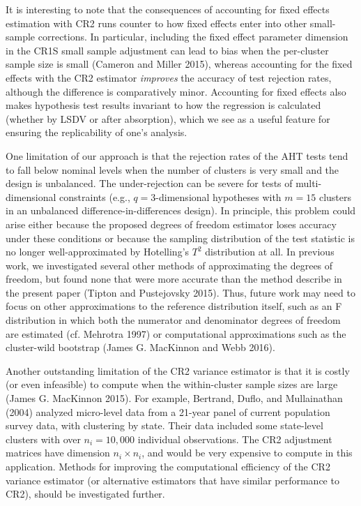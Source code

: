 \documentclass[12pt]{article}
\begin{document}
It is interesting to note that the consequences of accounting for fixed
effects estimation with CR2 runs counter to how fixed effects enter into
other small-sample corrections. In particular, including the fixed
effect parameter dimension in the CR1S small sample adjustment can lead
to bias when the per-cluster sample size is small (Cameron and Miller
2015), whereas accounting for the fixed effects with the CR2 estimator
\emph{improves} the accuracy of test rejection rates, although the
difference is comparatively minor. Accounting for fixed effects also
makes hypothesis test results invariant to how the regression is
calculated (whether by LSDV or after absorption), which we see as a
useful feature for ensuring the replicability of one's analysis.

One limitation of our approach is that the rejection rates of the AHT
tests tend to fall below nominal levels when the number of clusters is
very small and the design is unbalanced. The under-rejection can be
severe for tests of multi-dimensional constraints (e.g.,
\(q = 3\)-dimensional hypotheses with \(m = 15\) clusters in an
unbalanced difference-in-differences design). In principle, this problem
could arise either because the proposed degrees of freedom estimator
loses accuracy under these conditions or because the sampling
distribution of the test statistic is no longer well-approximated by
Hotelling's \(T^2\) distribution at all. In previous work, we
investigated several other methods of approximating the degrees of
freedom, but found none that were more accurate than the method describe
in the present paper (Tipton and Pustejovsky 2015). Thus, future work
may need to focus on other approximations to the reference distribution
itself, such as an F distribution in which both the numerator and
denominator degrees of freedom are estimated (cf. Mehrotra 1997) or
computational approximations such as the cluster-wild bootstrap (James
G. MacKinnon and Webb 2016).

Another outstanding limitation of the CR2 variance estimator is that it
is costly (or even infeasible) to compute when the within-cluster sample
sizes are large (James G. MacKinnon 2015). For example, Bertrand, Duflo,
and Mullainathan (2004) analyzed micro-level data from a 21-year panel
of current population survey data, with clustering by state. Their data
included some state-level clusters with over \(n_i = 10,000\) individual
observations. The CR2 adjustment matrices have dimension
\(n_i \times n_i\), and would be very expensive to compute in this
application. Methods for improving the computational efficiency of the
CR2 variance estimator (or alternative estimators that have similar
performance to CR2), should be investigated further.
\end{document}

